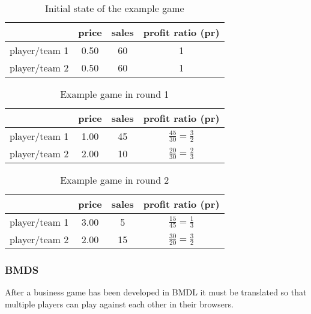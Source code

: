 \begin{description}
\begin{table}[ht]
	\centering
    \begin{tabular}{ l| c c c }
      & price & sales & profit ratio (pr) \\
      \hline
      player/team 1 & 0.50 & 60 & 1\\
      player/team 2 & 0.50 & 60 & 1\\
    \end{tabular}
	\caption{Initial state of the example game}
    \label{tab:bmdl0}
\end{table}

\begin{table}[ht]
	\centering
    \begin{tabular}{ l| c c c }
      & price & sales & profit ratio (pr) \\
      \hline
      player/team 1 & 1.00 & 45 & $\frac{45}{30}=\frac{3}{2}$\\
      player/team 2 & 2.00 & 10 & $\frac{20}{30}=\frac{2}{3}$\\
    \end{tabular}
	\caption{Example game in round 1}
    \label{tab:bmdl1}
\end{table}

\begin{table}[ht]
	\centering
    \begin{tabular}{ c| c c c }
      & price & sales & profit ratio (pr) \\
      \hline
      player/team 1 & 3.00 & 5 & $\frac{15}{45}=\frac{1}{3}$\\
      player/team 2 & 2.00 & 15 & $\frac{30}{20}=\frac{3}{2}$\\
    \end{tabular}
	\caption{Example game in round 2}
    \label{tab:bmdl2}
\end{table}
\end{description}

\subsubsection{BMDS}
\label{subsub:bmds}


After a business game has been developed in BMDL it must be translated so that multiple players can play against each other in their browsers. 

